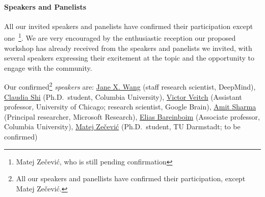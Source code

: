\documentclass{article}
\begin{document}




\paragraph{Speakers and Panelists}

All our invited speakers and panelists have confirmed their participation except one~\footnote{Matej Zečević, who is still pending confirmation}.
We are very encouraged by the enthusiastic reception our proposed workshop has already received from the speakers and panelists we invited, with several speakers expressing their excitement at the topic and the opportunity to engage with the community.



Our confirmed\footnote{All our speakers and panellists have confirmed their participation, except Matej Zečević.} \textit{speakers} are: 
\href{https://www.janexwang.com/}{Jane X. Wang} (staff research scientist, DeepMind),
\href{https://www.claudiajshi.com/}{Claudia Shi} (Ph.D.\ student, Columbia University),
\href{http://victorveitch.com/}{Victor Veitch} (Assistant professor, University of Chicago; research scientist, Google Brain),
\href{https://amitsharma.in/}{Amit Sharma} (Principal researcher, Microsoft Research),
\href{https://causalai.net/}{Elias Bareinboim} (Associate professor, Columbia University), 
\href{https://www.matej-zecevic.de/}{Matej Zečević} (Ph.D.\ student, TU Darmstadt; to be confirmed)
\end{document}

